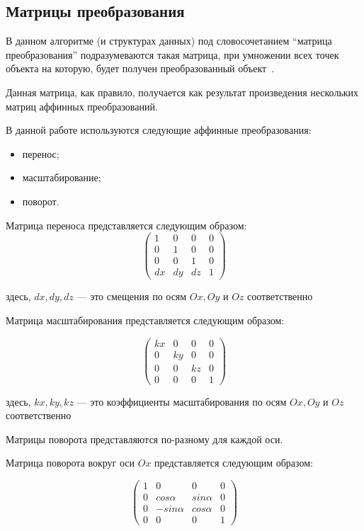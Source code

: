\subsection{Матрицы преобразования}

В данном алгоритме (и структурах данных) под словосочетанием ``матрица преобразования'' подразумеваются такая матрица, при умножении всех точек объекта на которую, будет получен преобразованный объект~\cite{CGPaP}.

Данная матрица, как правило, получается как результат произведения нескольких матриц аффинных преобразований.

В данной работе используются следующие аффинные преобразования:

\begin{itemize}
    \item перенос;
    \item масштабирование;
    \item поворот.
\end{itemize}

Матрица переноса представляется следующим образом:
$$
\begin{pmatrix}
    1 & 0 & 0 & 0 \\
    0 & 1 & 0 & 0 \\
    0 & 0 & 1 & 0 \\
    dx & dy & dz & 1
\end{pmatrix}
$$

здесь, $dx, dy, dz$ --- это смещения по осям $Ox, Oy$ и $Oz$ соответственно

Матрица масштабирования представляется следующим образом:

$$
\begin{pmatrix}
    kx & 0 & 0 & 0 \\
    0 & ky & 0 & 0 \\
    0 & 0 & kz & 0 \\
    0 & 0 & 0 & 1
\end{pmatrix}
$$

здесь, $kx, ky, kz$ --- это коэффициенты масштабирования по осям $Ox, Oy$ и $Oz$ соответственно

Матрицы поворота представляются по-разному для каждой оси.

Матрица поворота вокруг оси $Ox$ представляется следующим образом:

$$
\begin{pmatrix}
    1 & 0 & 0 & 0 \\
    0 & cos \alpha & sin \alpha & 0 \\
    0 & -sin \alpha & cos \alpha & 0 \\
    0 & 0 & 0 & 1
\end{pmatrix}
$$


